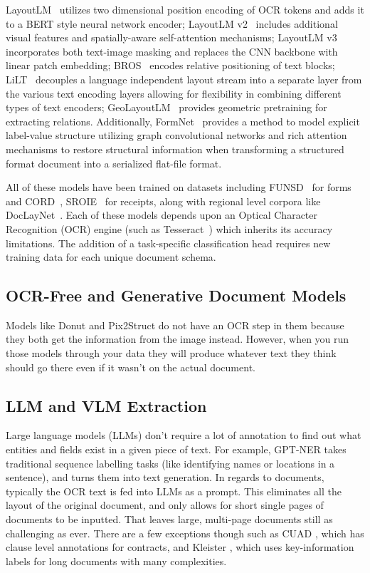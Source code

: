 \documentclass[conference]{IEEEtran}
\begin{document}
LayoutLM~\cite{layoutlm} utilizes two dimensional position encoding of OCR tokens and adds it to a BERT style neural network encoder; LayoutLM v2~\cite{layoutlmv2} includes additional visual features and spatially-aware self-attention mechanisms; LayoutLM v3~\cite{layoutlmv3} incorporates both text-image masking and replaces the CNN backbone with linear patch embedding; BROS~\cite{hong2022bros} encodes relative positioning of text blocks; LiLT~\cite{wang2022lilt} decouples a language independent layout stream into a separate layer from the various text encoding layers allowing for flexibility in combining different types of text encoders; GeoLayoutLM~\cite{luo2023geolayoutlm} provides geometric pretraining for extracting relations. Additionally, FormNet~\cite{lee2022formnet} provides a method to model explicit label-value structure utilizing graph convolutional networks and rich attention mechanisms to restore structural information when transforming a structured format document into a serialized flat-file format.

All of these models have been trained on datasets including FUNSD~\cite{jaume2019funsd} for forms and CORD~\cite{park2019cord}, SROIE~\cite{huang2019sroie} for receipts, along with regional level corpora like DocLayNet~\cite{pfitzmann2022doclaynet}. Each of these models depends upon an Optical Character Recognition (OCR) engine (such as Tesseract~\cite{smith2007tesseract}) which inherits its accuracy limitations. The addition of a task-specific classification head requires new training data for each unique document schema.

\subsection{OCR-Free and Generative Document Models}

Models like Donut \cite{kim2022donut} and Pix2Struct \cite{lee2023pix2struct} do not have an OCR step in them because they both get the information from the image instead. However, when you run those models through your data they will produce whatever text they think should go there even if it wasn't on the actual document. 
\subsection{LLM and VLM Extraction}

Large language models (LLMs) don’t require a lot of annotation to find out what entities and fields exist in a given piece of text. For example, GPT-NER \cite{gptner2025} takes traditional sequence labelling tasks (like identifying names or locations in a sentence), and turns them into text generation. In regards to documents, typically the OCR text is fed into LLMs as a prompt. This eliminates all the layout of the original document, and only allows for short single pages of documents to be inputted. That leaves large, multi-page documents still as challenging as ever. There are a few exceptions though such as CUAD \cite{cuad2021}, which has clause level annotations for contracts, and Kleister \cite{stanislawek2021kleister}, which uses key-information labels for long documents with many complexities.
\end{document}

